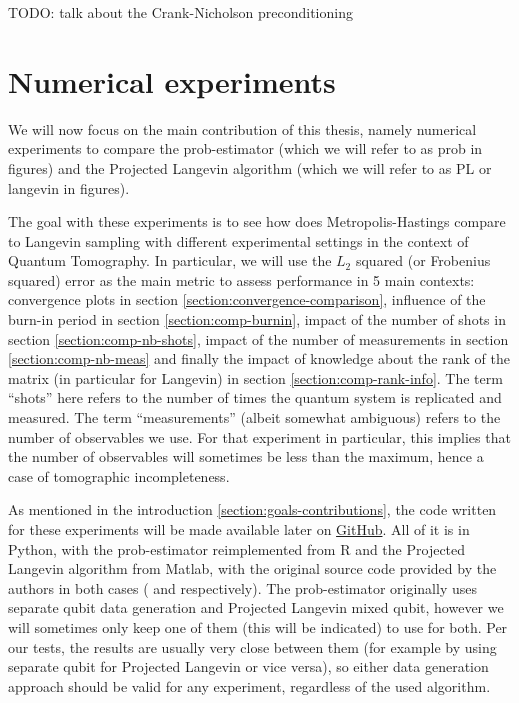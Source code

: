 \documentclass[12pt]{memoir}
\begin{document}
TODO: talk about the Crank-Nicholson preconditioning  



\chapter{Numerical experiments}\label{section:numerical-exp}
We will now focus on the main contribution of this thesis, namely numerical experiments to compare the prob-estimator (which we will refer to as prob in figures) and the Projected Langevin algorithm (which we will refer to as PL or langevin in figures).\medbreak

The goal with these experiments is to see how does Metropolis-Hastings compare to Langevin sampling with different experimental settings in the context of Quantum Tomography. In particular, we will use the $L_2$ squared (or Frobenius squared) error as the main metric to assess performance in 5 main contexts: convergence plots in section \ref{section:convergence-comparison}, influence of the burn-in period in section \ref{section:comp-burnin}, impact of the number of shots in section \ref{section:comp-nb-shots}, impact of the number of measurements in section \ref{section:comp-nb-meas} and finally the impact of knowledge about the rank of the matrix (in particular for Langevin) in section \ref{section:comp-rank-info}. The term ``shots'' here refers to the number of times the quantum system is replicated and measured. The term ``measurements'' (albeit somewhat ambiguous) refers to the number of observables we use. For that experiment in particular, this implies that the number of observables will sometimes be less than the maximum, hence a case of tomographic incompleteness. \medbreak

As mentioned in the introduction \ref{section:goals-contributions}, the code written for these experiments will be made available later on \href{https://github.com/daqwes/thesis}{GitHub}. All of it is in Python, with the prob-estimator reimplemented from R and the Projected Langevin algorithm from Matlab, with the original source code provided by the authors in both cases (\cite{MA17} and \cite{meth:bayesian:Langevin:ACMT2024} respectively). The prob-estimator originally uses separate qubit data generation and Projected Langevin mixed qubit, however we will sometimes only keep one of them (this will be indicated) to use for both. Per our tests, the results are usually very close between them (for example by using separate qubit for Projected Langevin or vice versa), so either data generation approach should be valid for any experiment, regardless of the used algorithm.\medbreak
\end{document}
